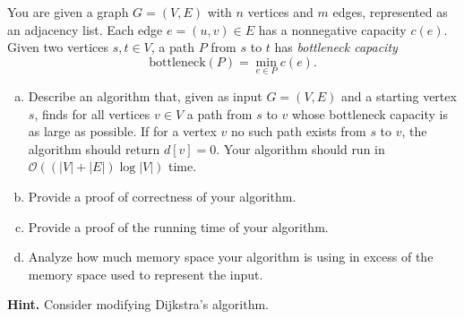 \documentclass{cs0500}
\begin{document}
\begin{solution}
\end{solution}
\pagebreak
\begin{problem}
You are given a graph $G = (V, E)$ with $n$ vertices and $m$ edges, represented as an adjacency list.
Each edge $e = (u,v) \in E$ has a nonnegative capacity $c(e)$.
Given two vertices $s, t \in V$, a path $P$ from $s$ to $t$ has
\emph{bottleneck capacity}
\[
\text{bottleneck}(P) = \min_{e \in P} c(e).
\]
\begin{enumerate}[(a)]
    \item  Describe an algorithm that, given as input $G=(V,E)$ and a starting vertex $s$, finds for all vertices $v\in V$ a path from $s$ to $v$ whose bottleneck capacity is as large as possible. If for a vertex $v$ no such path exists from $s$ to $v$, the algorithm should return $d[v]=0$. Your algorithm should run in $\mathcal{O}((|V|+|E|)\log |V|)$ time.
\item Provide a proof of correctness of your algorithm.
    \item Provide a proof of the running time of your algorithm.
    \item Analyze how much memory space your algorithm is using in excess of the memory space used to represent the input. 
\end{enumerate}
\medskip
\noindent \textbf{Hint.}
Consider modifying Dijkstra's algorithm.

\end{problem}
\begin{solution}  
\end{solution}
\pagebreak
\end{document}
